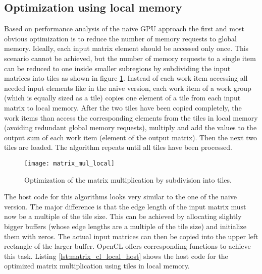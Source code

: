 \subsection{Optimization using local memory}
\label{sec:matrix_mul_local}
Based on performance analysis of the naive GPU approach the first and most obvious optimization is to reduce the number of memory requests to global memory. Ideally, each input matrix element should be accessed only once. This scenario cannot be achieved, but the number of memory requests to a single item can be reduced to one inside smaller subregions by subdividing the input matrices into tiles as shown in figure \ref{fig:matrix_mul_local}. Instead of each work item accessing all needed input elements like in the naive version, each work item of a work group (which is equally sized as a tile) copies one element of a tile from each input matrix to local memory. After the two tiles have been copied completely, the work items than access the corresponding elements from the tiles in local memory (avoiding redundant global memory requests), multiply and add the values to the output sum of each work item (element of the output matrix). Then the next two tiles are loaded. The algorithm repeats until all tiles have been processed.

\begin{figure}
\centering
\texttt{[image: matrix\_mul\_local]}
\caption{Optimization of the matrix multiplication by subdivision into tiles.}
\label{fig:matrix_mul_local}
\end{figure}

The host code for this algorithms looks very similar to the one of the naive version. The major difference is that the edge length of the input matrix must now be a multiple of the tile size. This can be achieved by allocating slightly bigger buffers (whose edge lengths are a multiple of the tile size) and initialize them with zeros. The actual input matrices can then be copied into the upper left rectangle of the larger buffer. OpenCL offers corresponding functions to achieve this task. Listing \ref{lst:matrix_cl_local_host} shows the host code for the optimized matrix multiplication using tiles in local memory.



